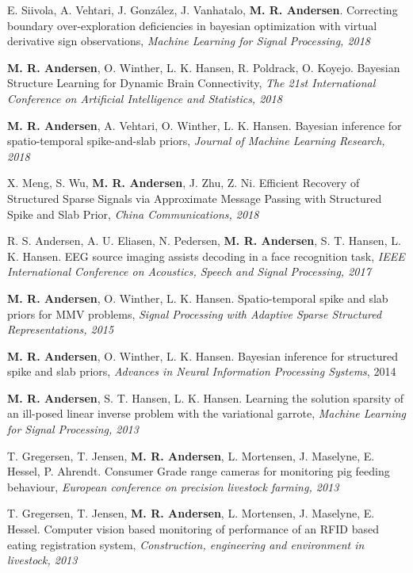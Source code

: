 \documentclass[10pt]{article}
\newcommand{\halfblankline}{\quad\vspace{-0.5\baselineskip}\pagebreak[3]}
\begin{document}
\begin{bibenum}

\item E. Siivola, A. Vehtari, J. Gonz\'alez, J. Vanhatalo, \textbf{M. R. Andersen}. Correcting boundary over-exploration deficiencies in bayesian optimization with virtual derivative sign observations,  \textit{Machine Learning for Signal Processing, 2018}

\item \textbf{M. R. Andersen}, O. Winther, L. K. Hansen, R. Poldrack, O. Koyejo. Bayesian Structure Learning for Dynamic Brain Connectivity, \textit{The 21st International Conference on 
Artificial Intelligence and Statistics, 2018}

\item \textbf{M. R. Andersen}, A. Vehtari, O. Winther, L. K. Hansen. Bayesian inference for spatio-temporal spike-and-slab priors, \textit{Journal of Machine Learning Research, 2018}

\item X. Meng, S. Wu, \textbf{M. R. Andersen}, J. Zhu, Z. Ni. Efficient Recovery of Structured Sparse Signals via Approximate Message Passing with Structured Spike and Slab Prior, \textit{China Communications, 2018}


\item R. S. Andersen, A. U. Eliasen, N. Pedersen, \textbf{M. R. Andersen}, S. T. Hansen, L. K. Hansen. EEG source imaging assists decoding in a face recognition task, \textit{IEEE International Conference on Acoustics, Speech and Signal Processing, 2017}

\item \textbf{M. R. Andersen},  O. Winther, L. K. Hansen. Spatio-temporal spike and slab priors for MMV problems, \textit{Signal Processing with Adaptive Sparse Structured Representations, 2015}

\item \textbf{M. R. Andersen}, O. Winther, L. K. Hansen. Bayesian inference for structured spike and slab priors, \textit{Advances in Neural Information Processing Systems}, 2014

\item \textbf{M. R. Andersen}, S. T. Hansen, L. K. Hansen. Learning the solution sparsity of an ill-posed linear inverse problem with the variational garrote, \textit{Machine Learning for Signal Processing, 2013}

\item T. Gregersen, T. Jensen, \textbf{M. R. Andersen}, L. Mortensen, J. Maselyne, E. Hessel, P. Ahrendt. Consumer Grade range cameras for monitoring pig feeding behaviour, \textit{European conference on precision livestock farming, 2013}

\item T. Gregersen, T. Jensen, \textbf{M. R. Andersen}, L. Mortensen, J. Maselyne, E. Hessel. Computer vision based monitoring of performance of an RFID based eating registration system,  \textit{Construction, engineering and environment in livestock, 2013}
\end{bibenum}
\halfblankline
\end{document}
